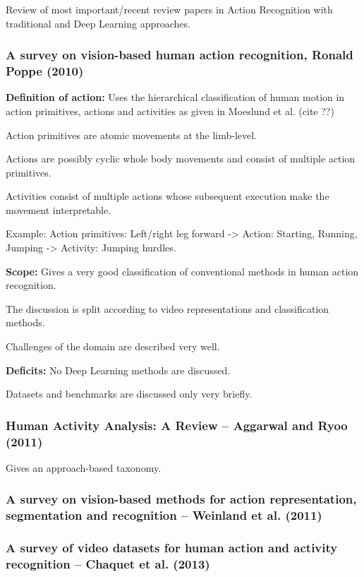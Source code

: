 Review of most important/recent review papers in Action Recognition with traditional and Deep Learning approaches.

\subsubsection{A survey on vision-based human action recognition, Ronald Poppe (2010)}

\textbf{Definition of action:} Uses the hierarchical classification of human motion in action primitives, actions and activities as given in Moeslund et al. (cite ??)

Action primitives are atomic movements at the limb-level.

Actions are possibly cyclic whole body movements and consist of multiple action primitives.

Activities consist of multiple actions whose subsequent execution make the movement interpretable.

Example: Action primitives: Left/right leg forward -> Action: Starting, Running, Jumping -> Activity: Jumping hurdles.

\textbf{Scope:} Gives a very good classification of conventional methods in human action recognition.

The discussion is split according to video representations and classification methods.

Challenges of the domain are described very well.

\textbf{Deficits:} No Deep Learning methods are discussed. 

Datasets and benchmarks are discussed only very briefly.

\subsubsection{Human Activity Analysis: A Review -- Aggarwal and Ryoo (2011)}

Gives an approach-based taxonomy.

\subsubsection{A survey on vision-based methods for action representation, segmentation and recognition -- Weinland et al. (2011)}

\subsubsection{A survey of video datasets for human action and activity recognition -- Chaquet et al. (2013)}

